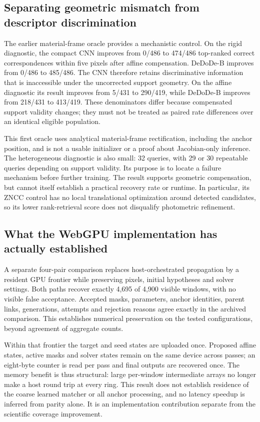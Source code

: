 \subsection{Separating geometric mismatch from descriptor discrimination}
The earlier material-frame oracle provides a mechanistic control. On the rigid diagnostic, the compact CNN improves from 0/486 to 474/486 top-ranked correct correspondences within five pixels after affine compensation. DeDoDe-B improves from 0/486 to 485/486. The CNN therefore retains discriminative information that is inaccessible under the uncorrected support geometry. On the affine diagnostic its result improves from 5/431 to 290/419, while DeDoDe-B improves from 218/431 to 413/419. These denominators differ because compensated support validity changes; they must not be treated as paired rate differences over an identical eligible population.

This first oracle uses analytical material-frame rectification, including the anchor position, and is not a usable initializer or a proof about Jacobian-only inference. The heterogeneous diagnostic is also small: 32 queries, with 29 or 30 repeatable queries depending on support validity. Its purpose is to locate a failure mechanism before further training. The result supports geometric compensation, but cannot itself establish a practical recovery rate or runtime. In particular, its ZNCC control has no local translational optimization around detected candidates, so its lower rank-retrieval score does not disqualify photometric refinement.

\subsection{What the WebGPU implementation has actually established}
A separate four-pair comparison replaces host-orchestrated propagation by a resident GPU frontier while preserving pixels, initial hypotheses and solver settings. Both paths recover exactly 4,695 of 4,900 visible windows, with no visible false acceptance. Accepted masks, parameters, anchor identities, parent links, generations, attempts and rejection reasons agree exactly in the archived comparison. This establishes numerical preservation on the tested configurations, beyond agreement of aggregate counts.

Within that frontier the target and seed states are uploaded once. Proposed affine states, active masks and solver states remain on the same device across passes; an eight-byte counter is read per pass and final outputs are recovered once. The memory benefit is thus structural: large per-window intermediate arrays no longer make a host round trip at every ring. This result does not establish residence of the coarse learned matcher or all anchor processing, and no latency speedup is inferred from parity alone. It is an implementation contribution separate from the scientific coverage improvement.
